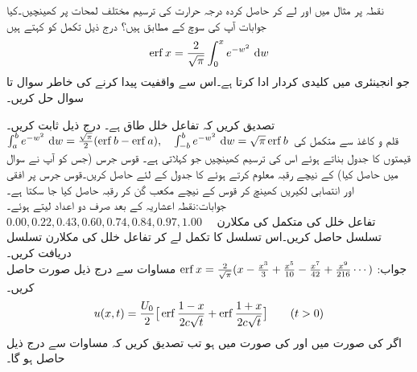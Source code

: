 \quad
نقطہ  پر مثال  میں  اور  لے کر حاصل کردہ درجہ حرارت  کی ترسیم مختلف لمحات پر  کھینچیں۔کیا جوابات آپ کی سوچ کے مطابق ہیں؟
 درج ذیل تکمل کو کہتے ہیں
\begin{align*}
\erf x =\frac{2}{\sqrt{\pi}}\int_0^x e^{-w^2}\,\dif w
\end{align*} 
جو انجینئری میں کلیدی کردار ادا کرتا ہے۔اس سے واقفیت  پیدا کرنے کی خاطر سوال  تا سوال  حل کریں۔

\quad 
تصدیق کریں کہ تفاعل خلل طاق ہے۔
\quad درج ذیل ثابت کریں۔\\
 $\int_a^be^{-w^2}\,\dif w=\frac{\sqrt{\pi}}{2}(\erf b-\erf a),\quad \int_{-b}^be^{-w^2}\,\dif w=\sqrt{\pi}\erf b$
\quad
قلم و کاغذ سے متکمل  کی قیمتوں کا جدول بناتے ہوئے اس کی ترسیم کھینچیں جو  کہلاتی ہے۔  
\quad
قوس جرس (جس کو آپ نے سوال  میں حاصل کیا) کے نیچے رقبہ معلوم کرتے ہوئے  کا جدول  کے لئے حاصل کریں۔قوس جرس پر افقی اور انتصابی لکیریں کھینچ کر قوس کے نیچے مکعب گن کر رقبہ حاصل کیا جا سکتا ہے۔\\
جوابات:\quad نقطہ اعشاریہ کے بعد صرف دو اعداد لیتے ہوئے۔\\
$0.00, 0.22, 0.43, 0.60, 0.74, 0.84,0.97,1.00\quad $
\quad تفاعل خلل کی متکمل  کی مکلارن تسلسل حاصل کریں۔اس تسلسل کا تکمل لے کر تفاعل خلل  کی مکلارن تسلسل دریافت کریں۔\\
جواب:\quad
$\operatorname{erf} x=\tfrac{2}{\sqrt{\pi}}(x-\tfrac{x^3}{3}+\tfrac{x^5}{10}-\tfrac{x^7}{42}+\tfrac{x^9}{216}\cdots)$
\quad 
مساوات  سے درج ذیل صورت  حاصل کریں۔
\begin{align*}
u(x,t)=\frac{U_0}{2}\big[\operatorname{erf} \frac{1-x}{2c\sqrt{t}}+\operatorname{erf} \frac{1+x}{2c\sqrt{t}}\big]\quad \quad (t>0)
\end{align*}
\quad اگر  کی صورت میں  اور  کی صورت میں  ہو تب تصدیق کریں کہ مساوات  سے درج ذیل حاصل ہو گا۔
